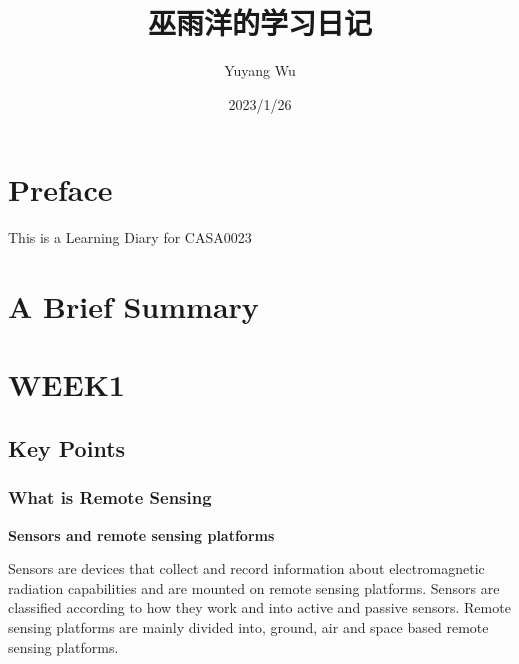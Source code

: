 \documentclass[
  letterpaper,
  DIV=11,
  numbers=noendperiod]{scrreprt}
\title{巫雨洋的学习日记}
\author{Yuyang Wu}
\date{2023/1/26}
\renewcommand*\contentsname{Table of contents}
\newcommand\contentsname{Table of contents}
\begin{document}
\maketitle
\ifdefined\Shaded\renewenvironment{Shaded}{\begin{tcolorbox}[borderline west={3pt}{0pt}{shadecolor}, interior hidden, boxrule=0pt, frame hidden, sharp corners, enhanced, breakable]}{\end{tcolorbox}}\fi

\renewcommand*\contentsname{Table of contents}
{
\hypersetup{linkcolor=}
\setcounter{tocdepth}{2}
\tableofcontents
}

\hypertarget{preface}{%
\chapter*{Preface}\label{preface}}

This is a Learning Diary for CASA0023


\hypertarget{a-brief-summary}{%
\chapter*{A Brief Summary}\label{a-brief-summary}}


\hypertarget{week1}{%
\chapter{WEEK1}\label{week1}}

\hypertarget{key-points}{%
\section{Key Points}\label{key-points}}

\hypertarget{what-is-remote-sensing}{%
\subsection{What is Remote Sensing}\label{what-is-remote-sensing}}

\textbf{Sensors and remote sensing platforms}

Sensors are devices that collect and record information about
electromagnetic radiation capabilities and are mounted on remote sensing
platforms. Sensors are classified according to how they work and into
active and passive sensors. Remote sensing platforms are mainly divided
into, ground, air and space based remote sensing platforms.
\end{document}
